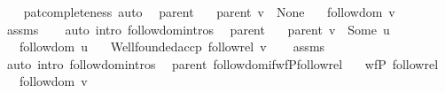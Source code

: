 \begin{isabellebody}
%
\isadelimproof
\ \ %
\endisadelimproof
%
\isatagproof
{}\isamarkupfalse%
\ pat{\isacharunderscore}{\kern0pt}completeness\ auto%
\endisatagproof
{\isafoldproof}%
%
\isadelimproof
%
\endisadelimproof
%
\isadelimdocument
%
\endisadelimdocument
%
\isatagdocument
%
\isamarkuptrue%
%
\endisatagdocument
{\isafolddocument}%
%
\isadelimdocument
%
\endisadelimdocument
{}\isamarkupfalse%
\ {\isacharparenleft}{\kern0pt}\ parent{\isacharparenright}{\kern0pt}\isanewline
\ \ \ {\isachardoublequoteopen}parent\ v\ {\isacharequal}{\kern0pt}\ None{\isachardoublequoteclose}\isanewline
\ \ \ {\isachardoublequoteopen}follow{\isacharunderscore}{\kern0pt}dom\ v{\isachardoublequoteclose}\isanewline
%
\isadelimproof
\ \ %
\endisadelimproof
%
\isatagproof
{}\isamarkupfalse%
\ assms\isanewline
\ \ \isamarkupfalse%
\ {\isacharparenleft}{\kern0pt}auto\ intro{\isacharcolon}{\kern0pt}\ follow{\isachardot}{\kern0pt}domintros{\isacharparenright}{\kern0pt}%
\endisatagproof
{\isafoldproof}%
%
\isadelimproof
\isanewline
%
\endisadelimproof
\isanewline
{}\isamarkupfalse%
\ {\isacharparenleft}{\kern0pt}\ parent{\isacharparenright}{\kern0pt}\isanewline
\ \ \ {\isachardoublequoteopen}parent\ v\ {\isacharequal}{\kern0pt}\ Some\ u{\isachardoublequoteclose}\isanewline
\ \ \ {\isachardoublequoteopen}follow{\isacharunderscore}{\kern0pt}dom\ u{\isachardoublequoteclose}\isanewline
\ \ \ {\isachardoublequoteopen}Wellfounded{\isachardot}{\kern0pt}accp\ follow{\isacharunderscore}{\kern0pt}rel\ v{\isachardoublequoteclose}\isanewline
%
\isadelimproof
\ \ %
\endisadelimproof
%
\isatagproof
{}\isamarkupfalse%
\ assms\isanewline
\ \ \isamarkupfalse%
\ {\isacharparenleft}{\kern0pt}auto\ intro{\isacharcolon}{\kern0pt}\ follow{\isachardot}{\kern0pt}domintros{\isacharparenright}{\kern0pt}%
\endisatagproof
{\isafoldproof}%
%
\isadelimproof
\isanewline
%
\endisadelimproof
\isanewline
{}\isamarkupfalse%
\ {\isacharparenleft}{\kern0pt}\ parent{\isacharparenright}{\kern0pt}\ follow{\isacharunderscore}{\kern0pt}dom{\isacharunderscore}{\kern0pt}if{\isacharunderscore}{\kern0pt}wfP{\isacharunderscore}{\kern0pt}follow{\isacharunderscore}{\kern0pt}rel{\isacharcolon}{\kern0pt}\isanewline
\ \ \ {\isachardoublequoteopen}wfP\ follow{\isacharunderscore}{\kern0pt}rel{\isachardoublequoteclose}\isanewline
\ \ \ {\isachardoublequoteopen}follow{\isacharunderscore}{\kern0pt}dom\ v{\isachardoublequoteclose}\isanewline

\end{isabellebody}
